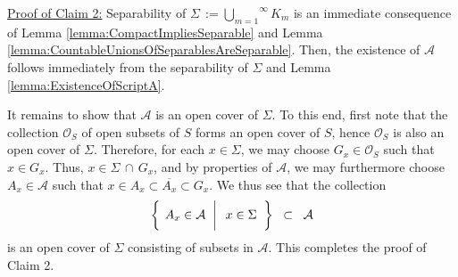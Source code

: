 \vskip 0.5cm
\noindent
\underline{Proof of Claim 2:}\quad
Separability of $\Sigma \,:= \overset{\infty}{\underset{m=1}{\bigcup}}K_{m}$
is an immediate consequence of
Lemma \ref{lemma:CompactImpliesSeparable} and
Lemma \ref{lemma:CountableUnionsOfSeparablesAreSeparable}.
Then, the existence of $\mathcal{A}$ follows immediately
from the separability of $\Sigma$
and Lemma \ref{lemma:ExistenceOfScriptA}.

\vskip 0.3cm
\noindent
It remains to show that $\mathcal{A}$ is an open cover of $\Sigma$.
To this end, first note that the collection $\mathcal{O}_{S}$ of open subsets of $S$
forms an open cover of $S$, hence $\mathcal{O}_{S}$ is also an open cover of $\Sigma$.
Therefore, for each $x \in \Sigma$, we may choose $G_{x} \in \mathcal{O}_{S}$
such that $x \in G_{x}$.
Thus, $x \in \Sigma\,\cap\,G_{x}$, and by properties of $\mathcal{A}$,
we may furthermore choose $A_{x} \in \mathcal{A}$ such that
$x \in A_{x} \subset \overline{A_{x}} \subset G_{x}$.
We thus see that the collection
\begin{equation*}
\left\{\;
\left.
A_{x} \in \overset{{\color{white}u}}{\mathcal{A}}
\;\;\right\vert\;\;
x \in \Sigma
\;\;\right\}
\;\; \subset \;\; \mathcal{A}
\end{equation*}
is an open cover of $\Sigma$ consisting of subsets in $\mathcal{A}$.
This completes the proof of Claim 2.

